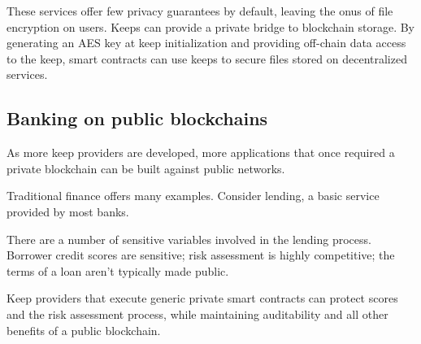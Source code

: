 \documentclass[11pt]{article}
\begin{document}
These services offer few privacy guarantees by default, leaving the
onus of file encryption on users. Keeps can provide a private bridge
to blockchain storage. By generating an AES key at keep initialization
and providing off-chain data access to the keep, smart contracts can
use keeps to secure files stored on decentralized services.

\subsection{Banking on public blockchains}

As more keep providers are developed, more applications that once
required a private blockchain can be built against public networks.

Traditional finance offers many examples. Consider lending, a basic
service provided by most banks.

There are a number of sensitive variables involved in the lending
process. Borrower credit scores are sensitive; risk assessment is
highly competitive; the terms of a loan aren't typically made public.

Keep providers that execute generic private smart contracts can
protect scores and the risk assessment process, while maintaining
auditability and all other benefits of a public blockchain.


{}
\end{document}
